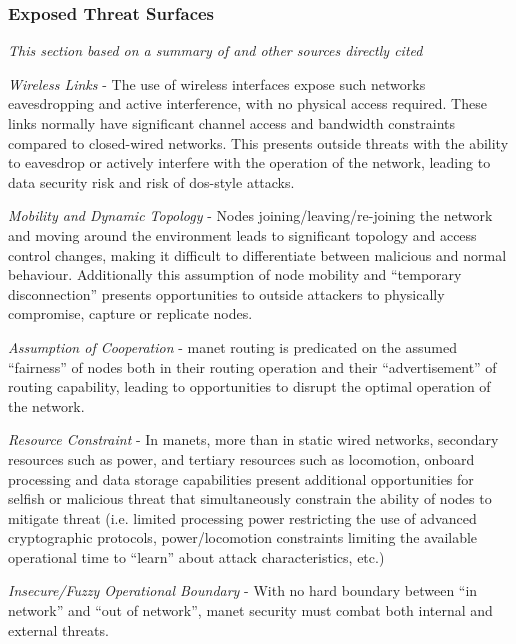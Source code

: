 \subsubsection{Exposed Threat Surfaces}
\emph{This section based on a summary of \citet{csen2010security} and other sources directly cited}

\emph{Wireless Links} - The use of wireless interfaces expose such networks eavesdropping and active interference, with no physical access required.
These links normally have significant channel access and bandwidth constraints compared to closed-wired networks.
This presents outside threats with the ability to eavesdrop or actively interfere with the operation of the network, leading to data security risk and risk of \gls{dos}-style attacks.

\emph{Mobility and Dynamic Topology} - Nodes joining/leaving/re-joining the network and moving around the environment leads to significant topology and access control changes, making it difficult to differentiate between malicious and normal behaviour.
Additionally this assumption of node mobility and ``temporary disconnection'' presents opportunities to outside attackers to physically compromise, capture or replicate nodes.

\emph{Assumption of Cooperation} - \gls{manet} routing is predicated on the assumed ``fairness'' of nodes both in their routing operation and their ``advertisement'' of routing capability, leading to opportunities to disrupt the optimal operation of the network\cite{Papadimitratos2002}.

\emph{Resource Constraint} - In \glspl{manet}, more than in static wired networks, secondary resources such as power, and tertiary resources such as locomotion, onboard processing and data storage capabilities present additional opportunities for selfish or malicious threat that simultaneously constrain the ability of nodes to mitigate threat (i.e. limited processing power restricting the use of advanced cryptographic protocols, power/locomotion constraints limiting the available operational time to ``learn'' about attack characteristics, etc.)

\emph{Insecure/Fuzzy Operational Boundary} - With no hard boundary between ``in network'' and ``out of network'', \gls{manet} security must combat both internal and external threats.



